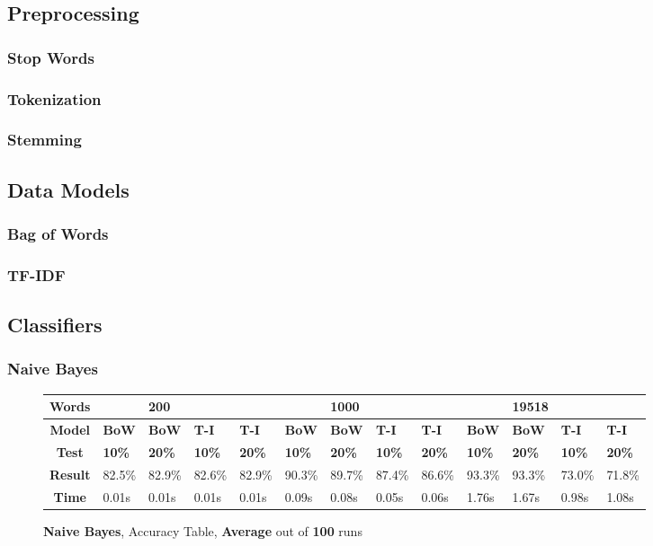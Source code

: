 \documentclass{article}
\begin{document}
	\subsection{Preprocessing}
	\subsubsection{Stop Words}
	\subsubsection{Tokenization}
	\subsubsection{Stemming}
	
	\subsection{Data Models}
	\subsubsection{Bag of Words}
	\subsubsection{TF-IDF}
	
	
	\subsection{Classifiers}
	\subsubsection{Naive Bayes}
	\begin{figure}[!h]
		\begin{tabular}{||c||l|l|l|l||l|l|l|l||l|l|l|l||}
			\hline
			\textbf{Words} &  & \textbf{200} & & & &\textbf{1000} & & & & \textbf{19518} &  & \\ \hline 
			\textbf{Model} & \textbf{BoW} & \textbf{BoW} & \textbf{T-I} & \textbf{T-I} &\textbf{BoW} & \textbf{BoW} & \textbf{T-I} & \textbf{T-I} & \textbf{BoW} & \textbf{BoW} & \textbf{T-I} & \textbf{T-I}\\ \hline
			\textbf{Test} & \textbf{10\%} & \textbf{20\%} & \textbf{10\%} & \textbf{20\%} & \textbf{10\%} & \textbf{20\%} & \textbf{10\%} & \textbf{20\%} & \textbf{10\%} & \textbf{20\%} & \textbf{10\%} & \textbf{20\%} \\ \hline \hline  
			\textbf{Result} & 82.5\% & 82.9\% & 82.6\% & 82.9\% & 90.3\% & 89.7\% & 87.4\% & 86.6\% & 93.3\% & 93.3\% & 73.0\% & 71.8\% \\ \hline 
			\textbf{Time} & 0.01s & 0.01s & 0.01s & 0.01s & 0.09s & 0.08s & 0.05s & 0.06s & 1.76s & 1.67s & 0.98s & 1.08s \\ \hline 
		\end{tabular}
		\caption{\textbf{Naive Bayes}, Accuracy Table, \textbf{Average} out of \textbf{100} runs}
	\end{figure}
    
\end{document}
